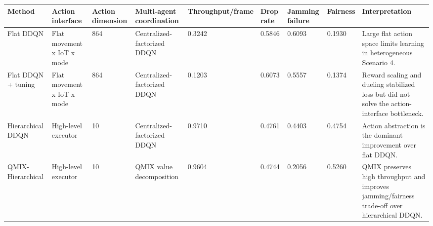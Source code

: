 \begin{tabular}{lllllllll}
\hline
Method & Action interface & Action dimension & Multi-agent coordination & Throughput/frame & Drop rate & Jamming failure & Fairness & Interpretation \\
\hline
Flat DDQN & Flat movement x IoT x mode & 864 & Centralized-factorized DDQN & 0.3242 & 0.5846 & 0.6093 & 0.1930 & Large flat action space limits learning in heterogeneous Scenario 4. \\
Flat DDQN + tuning & Flat movement x IoT x mode & 864 & Centralized-factorized DDQN & 0.1203 & 0.6073 & 0.5557 & 0.1374 & Reward scaling and dueling stabilized loss but did not solve the action-interface bottleneck. \\
Hierarchical DDQN & High-level executor & 10 & Centralized-factorized DDQN & 0.9710 & 0.4761 & 0.4403 & 0.4754 & Action abstraction is the dominant improvement over flat DDQN. \\
QMIX-Hierarchical & High-level executor & 10 & QMIX value decomposition & 0.9604 & 0.4744 & 0.2056 & 0.5260 & QMIX preserves high throughput and improves jamming/fairness trade-off over hierarchical DDQN. \\
\hline
\end{tabular}
